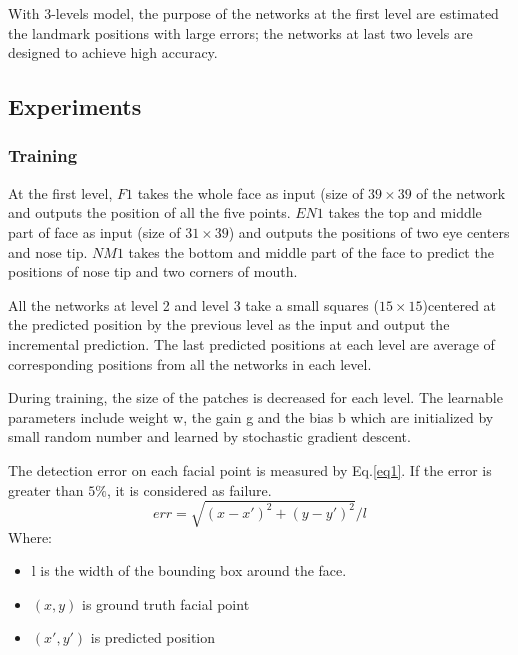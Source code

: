  With 3-levels model, the purpose of the networks at the first level are estimated the landmark positions with large errors; the networks at last two levels are designed to achieve high accuracy.
\subsection{Experiments}
\subsubsection{Training}
At the first level, $F1$ takes the whole face as input (size of $39 \times 39$ of the network and outputs the position of all the five points. $EN1$ takes the top and middle part of face as input (size of $31 \times 39$) and outputs the positions of two eye centers and nose tip. $NM1$ takes the bottom and middle part of the face to predict the positions of nose tip and two corners of mouth.

All the networks at level 2 and level 3 take a small squares ($15 \times 15$)centered at the predicted position by the previous level as the input and output the incremental prediction. The last predicted positions at each level are average of corresponding positions from all the networks in each level. 

During training, the size of the patches is decreased for each level. The learnable parameters include weight w, the gain g and the bias b which are initialized by small random number and learned by stochastic gradient descent.

The detection error on each facial point is measured by Eq.\ref{eq1}. If the error is greater than $5\%$, it is considered as failure.
\begin{equation}
	err = \sqrt{(x-x')^2 + (y-y')^2}/l
	\label{eq1}
\end{equation}
Where:
\begin{itemize}
	\item l is the width of the bounding box around the face.
	\item $(x,y)$ is ground truth facial point
	\item $(x',y')$ is predicted position
\end{itemize}
